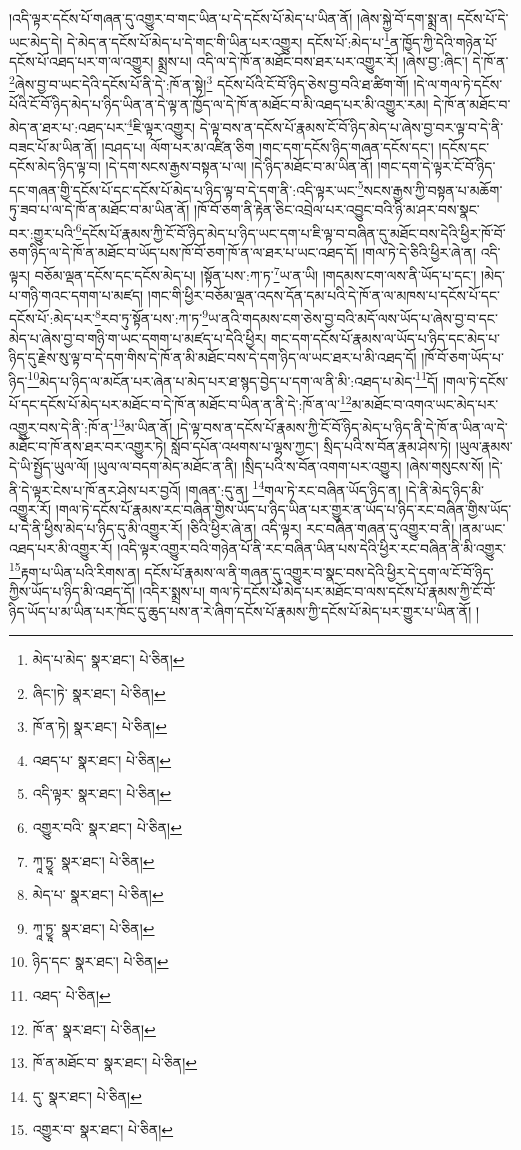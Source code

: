 །འདི་ལྟར་དངོས་པོ་གཞན་དུ་འགྱུར་བ་གང་ཡིན་པ་དེ་དངོས་པོ་མེད་པ་ཡིན་ནོ། །ཞེས་སྐྱེ་བོ་དག་སྨྲ་ན། དངོས་པོ་དེ་ཡང་མེད་དེ། དེ་མེད་ན་དངོས་པོ་མེད་པ་དེ་གང་གི་ཡིན་པར་འགྱུར། དངོས་པོ་:མེད་པ་\footnote{མེད་པ་མེད་  སྣར་ཐང་།  པེ་ཅིན། }ན་ཁྱོད་ཀྱི་དེའི་གཉེན་པོ་དངོས་པོ་འཐད་པར་ག་ལ་འགྱུར། སྨྲས་པ། འདི་ལ་དེ་ཁོ་ན་མཐོང་བས་ཐར་པར་འགྱུར་རོ། །ཞེས་བྱ་:ཞིང་། དེ་ཁོ་ན་\footnote{ཞིང་།ཏེ་  སྣར་ཐང་།  པེ་ཅིན། }ཞེས་བྱ་བ་ཡང་དེའི་དངོས་པོ་ནི་དེ་:ཁོ་ན་སྟེ།\footnote{ཁོ་ན་ཏེ།  སྣར་ཐང་།  པེ་ཅིན། } དངོས་པོའི་ངོ་བོ་ཉིད་ཅེས་བྱ་བའི་ཐ་ཚིག་གོ། །དེ་ལ་གལ་ཏེ་དངོས་པོའི་ངོ་བོ་ཉིད་མེད་པ་ཉིད་ཡིན་ན་དེ་ལྟ་ན་ཁྱོད་ལ་དེ་ཁོ་ན་མཐོང་བ་མི་འཐད་པར་མི་འགྱུར་རམ། དེ་ཁོ་ན་མཐོང་བ་མེད་ན་ཐར་པ་:འཐད་པར་\footnote{འཐད་པ་  སྣར་ཐང་།  པེ་ཅིན། }ཇི་ལྟར་འགྱུར། དེ་ལྟ་བས་ན་དངོས་པོ་རྣམས་ངོ་བོ་ཉིད་མེད་པ་ཞེས་བྱ་བར་ལྟ་བ་དེ་ནི་བཟང་པོ་མ་ཡིན་ནོ། །བཤད་པ། ལོག་པར་མ་འཛིན་ཅིག །གང་དག་དངོས་ཉིད་གཞན་དངོས་དང་། །དངོས་དང་དངོས་མེད་ཉིད་ལྟ་བ། །དེ་དག་སངས་རྒྱས་བསྟན་པ་ལ། །དེ་ཉིད་མཐོང་བ་མ་ཡིན་ནོ། །གང་དག་དེ་ལྟར་ངོ་བོ་ཉིད་དང་གཞན་གྱི་དངོས་པོ་དང་དངོས་པོ་མེད་པ་ཉིད་ལྟ་བ་དེ་དག་ནི་:འདི་ལྟར་ཡང་\footnote{འདི་ལྟར་  སྣར་ཐང་།  པེ་ཅིན། }སངས་རྒྱས་ཀྱི་བསྟན་པ་མཆོག་ཏུ་ཟབ་པ་ལ་དེ་ཁོ་ན་མཐོང་བ་མ་ཡིན་ནོ། །ཁོ་བོ་ཅག་ནི་རྟེན་ཅིང་འབྲེལ་པར་འབྱུང་བའི་ཉི་མ་ཤར་བས་སྣང་བར་:གྱུར་པའི་\footnote{འགྱུར་བའི་  སྣར་ཐང་།  པེ་ཅིན། }དངོས་པོ་རྣམས་ཀྱི་ངོ་བོ་ཉིད་མེད་པ་ཉིད་ཡང་དག་པ་ཇི་ལྟ་བ་བཞིན་དུ་མཐོང་བས་དེའི་ཕྱིར་ཁོ་བོ་ཅག་ཉིད་ལ་དེ་ཁོ་ན་མཐོང་བ་ཡོད་པས་ཁོ་བོ་ཅག་ཁོ་ན་ལ་ཐར་པ་ཡང་འཐད་དོ། །གལ་ཏེ་དེ་ཅིའི་ཕྱིར་ཞེ་ན། འདི་ལྟར། བཅོམ་ལྡན་དངོས་དང་དངོས་མེད་པ། །སྟོན་པས་:ཀ་ཏ་\footnote{ཀཱ་ཏྱཱ་  སྣར་ཐང་།  པེ་ཅིན། }ཡ་ན་ཡི། །གདམས་ངག་ལས་ནི་ཡོད་པ་དང་། །མེད་པ་གཉི་གའང་དགག་པ་མཛད། །གང་གི་ཕྱིར་བཅོམ་ལྡན་འདས་དོན་དམ་པའི་དེ་ཁོ་ན་ལ་མཁས་པ་དངོས་པོ་དང་དངོས་པོ་:མེད་པར་\footnote{མེད་པ་  སྣར་ཐང་།  པེ་ཅིན། }རབ་ཏུ་སྟོན་པས་:ཀ་ཏ་\footnote{ཀཱ་ཏྱཱ་  སྣར་ཐང་།  པེ་ཅིན། }ཡ་ནའི་གདམས་ངག་ཅེས་བྱ་བའི་མདོ་ལས་ཡོད་པ་ཞེས་བྱ་བ་དང་མེད་པ་ཞེས་བྱ་བ་གཉི་ག་ཡང་དགག་པ་མཛད་པ་དེའི་ཕྱིར། གང་དག་དངོས་པོ་རྣམས་ལ་ཡོད་པ་ཉིད་དང་མེད་པ་ཉིད་དུ་རྗེས་སུ་ལྟ་བ་དེ་དག་གིས་དེ་ཁོ་ན་མི་མཐོང་བས་དེ་དག་ཉིད་ལ་ཡང་ཐར་པ་མི་འཐད་དོ། །ཁོ་བོ་ཅག་ཡོད་པ་ཉིད་\footnote{ཉིད་དང་  སྣར་ཐང་།  པེ་ཅིན། }མེད་པ་ཉིད་ལ་མངོན་པར་ཞེན་པ་མེད་པར་ཐ་སྙད་བྱེད་པ་དག་ལ་ནི་མི་:འཐད་པ་མེད་\footnote{འཐད་  པེ་ཅིན། }དོ། །གལ་ཏེ་དངོས་པོ་དང་དངོས་པོ་མེད་པར་མཐོང་བ་དེ་ཁོ་ན་མཐོང་བ་ཡིན་ན་ནི་དེ་:ཁོ་ན་ལ་\footnote{ཁོ་ན་  སྣར་ཐང་།  པེ་ཅིན། }མ་མཐོང་བ་འགའ་ཡང་མེད་པར་འགྱུར་བས་དེ་ནི་:ཁོ་ན་\footnote{ཁོ་ན་མཐོང་བ་  སྣར་ཐང་།  པེ་ཅིན། }མ་ཡིན་ནོ། །དེ་ལྟ་བས་ན་དངོས་པོ་རྣམས་ཀྱི་ངོ་བོ་ཉིད་མེད་པ་ཉིད་ནི་དེ་ཁོ་ན་ཡིན་ལ་དེ་མཐོང་བ་ཁོ་ནས་ཐར་བར་འགྱུར་ཏེ། སློབ་དཔོན་འཕགས་པ་ལྷས་ཀྱང་། སྲིད་པའི་ས་བོན་རྣམ་ཤེས་ཏེ། །ཡུལ་རྣམས་དེ་ཡི་སྤྱོད་ཡུལ་ལོ། །ཡུལ་ལ་བདག་མེད་མཐོང་ན་ནི། །སྲིད་པའི་ས་བོན་འགག་པར་འགྱུར། །ཞེས་གསུངས་སོ། །དེ་ནི་དེ་ལྟར་ངེས་པ་ཁོ་ནར་ཤེས་པར་བྱའོ། །གཞན་:དུ་ན། \footnote{དུ་  སྣར་ཐང་།  པེ་ཅིན། }གལ་ཏེ་རང་བཞིན་ཡོད་ཉིད་ན། །དེ་ནི་མེད་ཉིད་མི་འགྱུར་རོ། །གལ་ཏེ་དངོས་པོ་རྣམས་རང་བཞིན་གྱིས་ཡོད་པ་ཉིད་ཡིན་པར་གྱུར་ན་ཡོད་པ་ཉིད་རང་བཞིན་གྱིས་ཡོད་པ་དེ་ནི་ཕྱིས་མེད་པ་ཉིད་དུ་མི་འགྱུར་རོ། །ཅིའི་ཕྱིར་ཞེ་ན། འདི་ལྟར། རང་བཞིན་གཞན་དུ་འགྱུར་བ་ནི། །ནམ་ཡང་འཐད་པར་མི་འགྱུར་རོ། །འདི་ལྟར་འགྱུར་བའི་གཉེན་པོ་ནི་རང་བཞིན་ཡིན་པས་དེའི་ཕྱིར་རང་བཞིན་ནི་མི་འགྱུར་\footnote{འགྱུར་བ་  སྣར་ཐང་།  པེ་ཅིན། }རྟག་པ་ཡིན་པའི་རིགས་ན། དངོས་པོ་རྣམས་ལ་ནི་གཞན་དུ་འགྱུར་བ་སྣང་བས་དེའི་ཕྱིར་དེ་དག་ལ་ངོ་བོ་ཉིད་ཀྱིས་ཡོད་པ་ཉིད་མི་འཐད་དོ། །འདིར་སྨྲས་པ། གལ་ཏེ་དངོས་པོ་མེད་པར་མཐོང་བ་ལས་དངོས་པོ་རྣམས་ཀྱི་ངོ་བོ་ཉིད་ཡོད་པ་མ་ཡིན་པར་ཁོང་དུ་ཆུད་པས་ན་རེ་ཞིག་དངོས་པོ་རྣམས་ཀྱི་དངོས་པོ་མེད་པར་གྱུར་པ་ཡིན་ནོ། །
